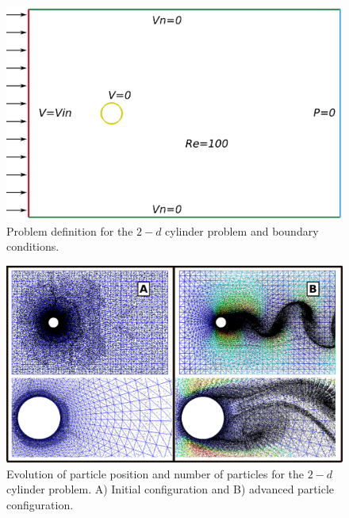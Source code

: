 \begin{figure}[htp] 
\centering 
\includegraphics[scale=.5]{./imgs/cyl_def.png}
\caption{Problem definition for the $2-d$ cylinder problem and boundary conditions.}
\label{fig:cyl_def}
\end{figure}
%
\begin{figure}[htp]
\centering 
\includegraphics[scale=.4]{./imgs/cyl_parts.png}
\caption{Evolution of particle position and number of particles for the $2-d$ cylinder problem. A) Initial configuration and B) advanced particle configuration.}
\label{fig:cyl_evol}
\end{figure}
%
